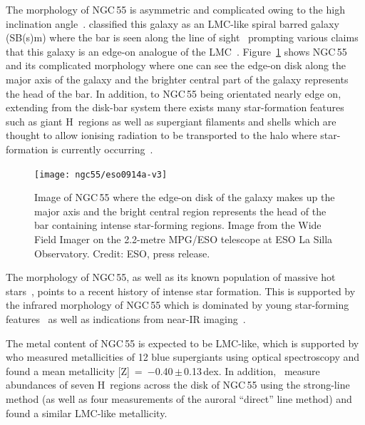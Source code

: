 The morphology of NGC\,55 is asymmetric and complicated owing to the high inclination angle~\cite[up to 80\textdegree;][]{1986A&A...166...97H,2013MNRAS.434.3511W}.
\cite{1961ApJ...133..405D} classified this galaxy as an LMC-like spiral barred galaxy (SB(s)m) where the bar is seen along the line of sight~\cite{1961ApJ...133..405D}
prompting various claims that this galaxy is an edge-on analogue of the LMC~\citep[e.g.][although not cited heavily -- two citations in 50 years -- the idea has propagated]{1964IAUS...20..276R}.
Figure~\ref{fig:ngc55-wide} shows NGC\,55 and its complicated morphology where one can see the edge-on disk along the major axis of the galaxy and the brighter central part of the galaxy represents the head of the bar.
In addition, to NGC\,55 being orientated nearly edge on, extending from the disk-bar system there exists many star-formation features such as giant H\,\2 regions as well as supergiant filaments and shells which are thought to allow ionising radiation to be transported to the halo where star-formation is currently occurring~\citep{1996AJ....112.2567F}.

\begin{figure}
 \centering
 \texttt{[image: ngc55/eso0914a-v3]}
 \caption[Image of NGC\,55]{Image of NGC\,55 where the edge-on disk of the galaxy makes up the major axis and the bright central region represents the head of the bar containing intense star-forming regions.
 Image from the Wide Field Imager on the 2.2-metre MPG/ESO telescope at ESO La Silla Observatory. Credit: ESO, press release.}
 \label{fig:ngc55-wide}
\end{figure}


The morphology of NGC\,55, as well as its known population of massive hot stars~\citep{2008A&A...485...41C,2012A&A...542A..79C}, points to a recent history of intense star formation.
This is supported by the infrared morphology of NGC\,55 which is dominated by young star-forming features~\citep[][with a star-formation rate of 0.22\,M$_{\odot}$yr$^{-1}$]{2004ApJS..154..248E} as well as indications from near-IR imaging~\citep{2005ApJ...622..279D}.

The metal content of NGC\,55 is expected to be LMC-like, which is supported by~\cite{2012A&A...542A..79C} who measured metallicities of 12 blue supergiants using optical spectroscopy and found a mean metallicity [Z]~=~$-$0.40\,$\pm$\,0.13\,dex.
In addition,~\cite{1983MNRAS.204..743W} measure abundances of seven H\,\2 regions across the disk of NGC\,55 using the strong-line method (as well as four measurements of the auroral ``direct'' line method) and found a similar LMC-like metallicity.

